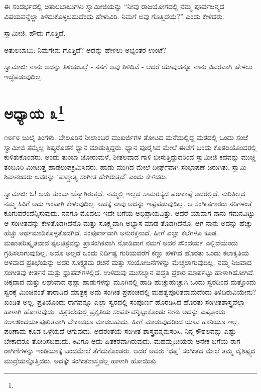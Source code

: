 ಈ ಸಂದರ್ಭದಲ್ಲಿ ಅತುಲಬಾಬುಗಳು ಸ್ವಾಮೀಜಿಯನ್ನು “ನೀವು ರಾಜಯೋಗದಲ್ಲಿ ನಮ್ಮ ಪೂರ್ವಜನ್ಮದ ವಿಷಯವನ್ನೆಲ್ಲಾ ತಿಳಿದುಕೊಳ್ಳಬಹುದೆಂದು ಹೇಳುವಿರಿ. ನಿಮಗೆ ಅವು ಗೊತ್ತಿದೆಯೆ?” ಎಂದು ಕೇಳಿದರು.

ಸ್ವಾಮೀಜಿ: ಹೌದು ಗೊತ್ತಿದೆ.

ಅತುಲಬಾಬು: ನಿಮಗೇನು ಗೊತ್ತಿದೆ? ಅದನ್ನು ಹೇಳಲು ಅಭ್ಯಂತರ ಉಂಟೆ?

ಸ್ವಾಮಾಜಿ: ನಾನು ಅದನ್ನು ತಿಳಿಯಬಲ್ಲೆ - ನನಗೆ ಅವು ತಿಳಿದಿವೆ - ಆದರೆ ಯಾವುದನ್ನೂ ನಾನು ವಿವರವಾಗಿ ಹೇಳಲು ಇಚ್ಛೆಪಡುವುದಿಲ್ಲ.

\newpage

\chapter[ಅಧ್ಯಾಯ ೩]{ಅಧ್ಯಾಯ ೩\protect\footnote{}}

೧೮೯೮ ಜುಲೈ ತಿಂಗಳು. ಬೇಲೂರಿನ ನೀಲಾಂಬರ ಮುಖರ್ಜಿಗಳ ತೋಟದ ಮನೆಯಲ್ಲಿದ್ದ ಮಠದಲ್ಲಿ ಒಂದು ಸಂಜೆ ಸ್ವಾಮೀಜಿ ತಮ್ಮೆಲ್ಲ ಶಿಷ್ಯರೊಡನೆ ಧ್ಯಾನ ಮಾಡುತ್ತಿದ್ದರು. ಧ್ಯಾನ ಪೂರೈಸಿದ ಮೇಲೆ ಈಚೆಗೆ ಬಂದು ಕೊಠಡಿಯೊಂದರಲ್ಲಿ ಕುಳಿತುಕೊಂಡರು. ಅಂದು ತುಂಬಾ ಜೋರುಮಳೆ, ಶೀತಲವಾದ ಗಾಳಿ ಬೀಸುತ್ತಿದ್ದುದರಿಂದ ಸ್ವಾಮೀಜಿ ಕದವನ್ನು ಮುಚ್ಚಿ ತಂಬೂರಿ ಮೀಟುತ್ತ ಹಾಡಲುಪಕ್ರಮಿಸಿದರು. ಹಾಡು ಮುಗಿದ ಮೇಲೆ ದೀರ್ಘವಾಗಿ ಸಂಭಾಷಣೆ ಜರುಗಿತು. ಸ್ವಾಮಿ ಶಿವಾನಂದರು ಅವರನ್ನು ‘ಪಾಶ್ಚಾತ್ಯ ಸಂಗೀತ ಹೇಗಿರುತ್ತದೆ’ ಎಂದು ಕೇಳಿದರು.

ಸ್ವಾಮಾಜಿ: ಓ! ಅದು ತುಂಬಾ ಚೆನ್ನಾಗಿರುತ್ತದೆ. ನಮ್ಮಲ್ಲಿ ಇಲ್ಲದ ಸಾಮರಸ್ಯದ ಪರಾಕಾಷ್ಠೆ ಅದರಲ್ಲಿದೆ. ನುರಿತಿಲ್ಲದ ನಮ್ಮ ಕಿವಿಗೆ ಅದು ಇಂಪಾಗಿ ಕೇಳುವುದಿಲ್ಲ. ಅದಕ್ಕೆ ನಾವು ಅದನ್ನು ಇಷ್ಟಪಡುವುದಿಲ್ಲ. ಆ ಸಂಗೀತಗಾರರು ನರಿಗಳಂತೆ ಕೂಗುವರೆಂದೆನ್ನಿಸುವುದು. ನನಗೂ ಮೊದಲು ಇದೇ ಬಗೆಯ ಅಭಿಪ್ರಾಯವಿತ್ತು. ಆದರೆ ಯಾವಾಗ ನಾನು ಗಮನವಿಟ್ಟು ಆ ಸಂಗೀತವನ್ನು ಕೇಳತೊಡಗಿದೆನೊ ಮತ್ತು ಸೂಕ್ಷ್ಮವಾಗಿ ಅಭ್ಯಾಸ ಮಾಡ ತೊಡಗಿದೆನೊ, ಆಗ ನಾನು ಅದನ್ನು ಹೆಚ್ಚು ಹೆಚ್ಚು ಅರ್ಥಮಾಡಿಕೊಳ್ಳತೊಡಗಿದೆ. ಸಂಪೂರ್ಣವಾಗಿ ಅನುರಕ್ತನಾದೆ. ಹೀಗೆ ಎಲ್ಲಾ ಕಲೆಗಳೂ ಕೂಡ. ಮಹಾಪರಿಷ್ಕೃತವಾದ ತೈಲಚಿತ್ರವನ್ನು ಪ್ರಾಸಂಗಿಕವಾಗಿ ನೋಡಿದಾಗ ನಮಗೆ ಅದರ ಸೌಂದರ್ಯ ಎಲ್ಲಿದೆಯೆಂದು ಗ್ರಹಿಸಲಾಗುವುದಿಲ್ಲ. ಅದೂ ಅಲ್ಲದೆ ಒಂದು ನಿರ್ದಿಷ್ಟ ಗುರಿಯವರೆಗೆ ಕಣ್ಣು ಪಳಗಿದ ಹೊರತು ಒಂದು ಕಲಾಕೃತಿಯ ಆಳವಾದ ಪ್ರತಿಭೆಯನ್ನು ಅದರ ಸೂಕ್ಷ್ಮತಮ ರಚನೆ ಮತ್ತು ಸಂಯೋಜನೆಗಳನ್ನು ಮೆಚ್ಚಲಾಗುವುದಿಲ್ಲ. ನಮ್ಮ ನಿಜವಾದ ಸಂಗೀತವು ಕೀರ್ತನೆ ಮತ್ತು ಧ್ರುಪದ್‌ಗಳಲ್ಲಿದೆ. ಉಳಿದುವು ಮುಸಲ್ಮಾನ ಪದ್ಧತಿ ಪ್ರಕಾರ ಮಾರ್ಪಟ್ಟು ಹಾಳಾಗಿಹೋಗಿವೆ. ಚಿಕ್ಕದಾದ ಮತ್ತು ಲಘುವಾದ ಥಪ್ಪಾ ಹಾಡುಗಳನ್ನು ಮೂಗಿನಲ್ಲಿ ಹಾಡಿ ಹುಚ್ಚುಹುಚ್ಚಾಗಿ ಒಂದು ಸ್ವರದಿಂದ ಮತ್ತೊಂದು ಸ್ವರಕ್ಕೆ ಮಿಂಚಿನಂತೆ ತಾರಾಡಿದ ಮಾತ್ರಕ್ಕೆ ಅದು ಸಂಗೀತ ಪ್ರಪಂಚದಲ್ಲಿ ಮಹತ್ವಪೂರಿತವಾದುದೆಂದು ತಿಳಿದಿರುವಿಯೇನು? ಖಂಡಿತ ಅಲ್ಲ. ಪ್ರತಿಯೊಂದು ರಾಗವನ್ನೂ ಎಲ್ಲಾ ಸ್ವರದಲ್ಲಿ ಸಂಪೂರ್ಣ ಹೊರಡಿಸಿದ ಹೊರತು ಸಂಗೀತಶಾಸ್ತ್ರವೆಲ್ಲಾ ಹಾಳಾಗಿ ಹೋಗುವುದು. ಚಿತ್ರಕಲೆಯಲ್ಲಿ ಪ್ರಕೃತಿಯ ಸಂಪರ್ಕವನ್ನಿಟ್ಟುಕೊಂಡು ನೀನು ಅದನ್ನು ಎಷ್ಟೊಂದು ಕಲಾಸೌಂದರ್ಯಪೂರಿತವಾಗಿ ಬೇಕಾದರೂ ಮಾಡಬಹುದು. ಹೀಗೆ ಮಾಡುವುದರಿಂದ ಯಾವ ಹಾನಿಯೂ ಇಲ್ಲ. ಪರಿಣಾಮ ಕೂಡ ಒಳ್ಳೆಯದೆ ಆಗುವುದು. ಅದರಂತೆಯೆ ಸಂಗೀತ ಶಾಸ್ತ್ರವನ್ನನುಸರಿಸಿ, ನಿನ್ನ ಕೌಶಲವನ್ನು ಎಷ್ಟು ಬೇಕಾದರೂ ತೋರಿಸಬಹುದು. ಕಿವಿಗೂ ಅದು ಹಿತಕರವಾಗಿರುವುದು. ಮಹಮ್ಮದೀಯರು ಅನೇಕ ಬಗೆಯ ರಾಗ ರಾಗಿಣಿಗಳನ್ನು ಇಂಡಿಯಾಕ್ಕೆ ಬಂದಮೇಲೆ ತೆಗೆದುಕೊಂಡರು. ಆದರೆ ಅವರು ‘ಥಪ್ಪ’ ಸಂಗೀತದ ಮೇಲೆ ತಮ್ಮ ವೈಶಿಷ್ಟ್ಯದ ಮುದ್ರೆಯನ್ನೊತ್ತಿದರು. ಅದಕ್ಕೇ ಸಂಗೀತಶಾಸ್ತ್ರವೆಲ್ಲ ಹಾಳಾಗಿ ಹೋಯಿತು.

